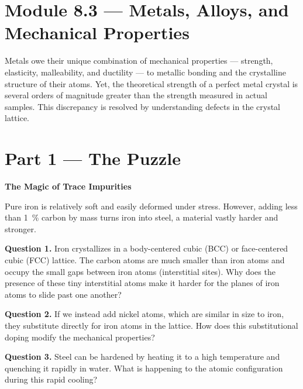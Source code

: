 \documentclass[12pt, a4paper]{book}
\begin{document}
\setcounter{chapter}{7}
\setcounter{section}{2}

\section{Module 8.3 --- Metals, Alloys, and Mechanical Properties}

Metals owe their unique combination of mechanical properties --- strength, elasticity, malleability, and ductility --- to metallic bonding and the crystalline structure of their atoms. Yet, the theoretical strength of a perfect metal crystal is several orders of magnitude greater than the strength measured in actual samples. This discrepancy is resolved by understanding defects in the crystal lattice.

\newpage

\section{Part 1 --- The Puzzle}

\begin{puzzlebox}
\textbf{The Magic of Trace Impurities}

Pure iron is relatively soft and easily deformed under stress. However, adding less than \SI{1}{\%} carbon by mass turns iron into steel, a material vastly harder and stronger.

\medskip
\begin{center}
\end{center}

\medskip
\textbf{Question 1.} Iron crystallizes in a body-centered cubic (BCC) or face-centered cubic (FCC) lattice. The carbon atoms are much smaller than iron atoms and occupy the small gaps between iron atoms (interstitial sites). Why does the presence of these tiny interstitial atoms make it harder for the planes of iron atoms to slide past one another?

\textbf{Question 2.} If we instead add nickel atoms, which are similar in size to iron, they substitute directly for iron atoms in the lattice. How does this substitutional doping modify the mechanical properties?

\textbf{Question 3.} Steel can be hardened by heating it to a high temperature and quenching it rapidly in water. What is happening to the atomic configuration during this rapid cooling?
\end{puzzlebox}
\end{document}

